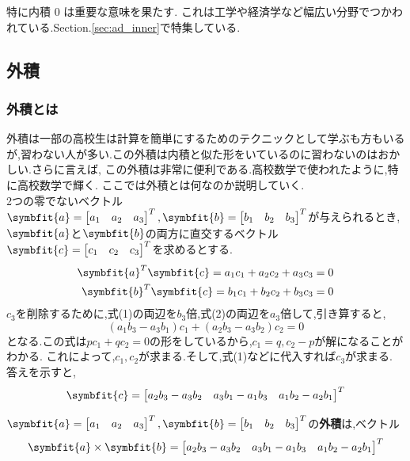 特に内積 0 は重要な意味を果たす.
これは工学や経済学など幅広い分野でつかわれている.Section.\ref{sec:ad_inner}で特集している.
\subsection{外積}
\subsubsection{外積とは}
外積は一部の高校生は計算を簡単にするためのテクニックとして学ぶも方もいるが,習わない人が多い.この外積は内積と似た形をいているのに習わないのはおかしい.さらに言えば,
この外積は非常に便利である.高校数学で使われたように,特に高校数学で輝く.
ここでは外積とは何なのか説明していく.\bigskip\\

2つの零でないベクトル$\symbfit{a}=\begin{bmatrix}a_1 & a_2 & a_3\end{bmatrix}^T,\symbfit{b}=\begin{bmatrix}b_1 & b_2 & b_3\end{bmatrix}^T$が与えられるとき,$\symbfit{a}$と$\symbfit{b}$の両方に直交するベクトル$\symbfit{c}=\begin{bmatrix}c_1 & c_2 & c_3\end{bmatrix}^T$を求めるとする.
\begin{align}
   \symbfit{a}^T\symbfit{c}=a_1c_1+a_2c_2+a_3c_3=0\\
   \symbfit{b}^T\symbfit{c}=b_1c_1+b_2c_2+b_3c_3=0
\end{align}
$c_3$を削除するために,式(1)の両辺を$b_3$倍,式(2)の両辺を$a_3$倍して,引き算すると,
\[
    (a_1b_3-a_3b_1)c_1+(a_2b_3-a_3b_2)c_2=0
\]
となる.この式は$pc_1+qc_2=0$の形をしているから,$c_1=q,c_2-p$が解になることがわかる.
これによって,$c_1,c_2$が求まる.そして,式(1)などに代入すれば$c_3$が求まる.
答えを示すと,
\[
    \symbfit{c}=\begin{bmatrix}a_2b_3-a_3b_2 & a_3b_1-a_1b_3 & a_1b_2-a_2b_1\end{bmatrix}^T
\]
\begin{tcolorbox}[colframe=black!80,colback=white,title=外積の定義]
    $\symbfit{a}=\begin{bmatrix}a_1 & a_2 & a_3\end{bmatrix}^T,\symbfit{b}=\begin{bmatrix}b_1 & b_2 & b_3\end{bmatrix}^T$の\textbf{外積}は,ベクトル
    \[
        \symbfit{a}\times \symbfit{b}=\begin{bmatrix}a_2b_3-a_3b_2 & a_3b_1-a_1b_3 & a_1b_2-a_2b_1\end{bmatrix}^T
    \]
\end{tcolorbox}
